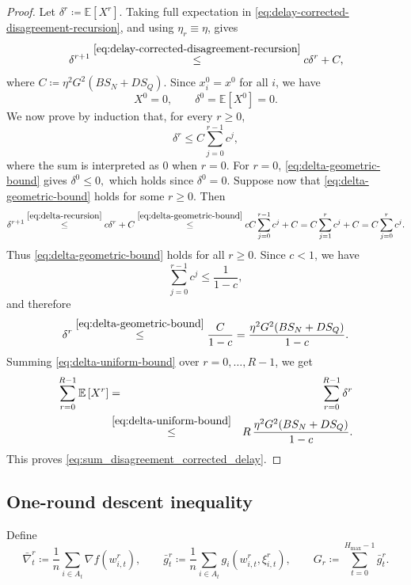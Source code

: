 \documentclass{article}
\newcommand{\eqdef}{\coloneqq}
\newcommand{\Exp}[1]{{\mathbb{E}} \left[ #1 \right]}
\theoremstyle{plain}
\theoremstyle{definition}
\begin{document}
\begin{proof}
Let
\(
\delta^r \eqdef \Exp{X^r}\).
Taking full expectation in \eqref{eq:delay-corrected-disagreement-recursion}, and using
\(\eta_r\equiv \eta\), gives
\begin{eqnarray}
\delta^{r+1}
\overset{\eqref{eq:delay-corrected-disagreement-recursion}}{\leq}
c\delta^r + C,
\label{eq:delta-recursion}
\end{eqnarray}
where \(C \eqdef \eta^2G^2(BS_N+DS_Q)\).
Since \(x_i^0=x^0\) for all \(i\), we have
\[
X^0=0,
\qquad
\delta^0=\Exp{X^0}=0.
\]
We now prove by induction that, for every \(r\geq 0\),
\begin{equation}
\delta^r
\leq
C\sum_{j=0}^{r-1}c^j,
\label{eq:delta-geometric-bound}
\end{equation}
where the sum is interpreted as \(0\) when \(r=0\).
For \(r=0\), \eqref{eq:delta-geometric-bound} gives
\(
\delta^0\leq 0,
\)
which holds since \(\delta^0=0\). Suppose now that \eqref{eq:delta-geometric-bound} holds for some \(r\geq 0\). Then
\begin{eqnarray*}
\delta^{r+1}
\overset{\eqref{eq:delta-recursion}}{\leq}
c\delta^r+C
\overset{\eqref{eq:delta-geometric-bound}}{\leq}
cC\sum_{j=0}^{r-1}c^j+C
=
C\sum_{j=1}^{r}c^j+C
=
C\sum_{j=0}^{r}c^j.
\end{eqnarray*}
Thus \eqref{eq:delta-geometric-bound} holds for all \(r\geq 0\). Since \(c<1\), we have
\[
\sum_{j=0}^{r-1}c^j
\leq
\frac{1}{1-c},
\]
and therefore
\begin{equation}
\delta^r
\overset{\eqref{eq:delta-geometric-bound}}{\leq}
\frac{C}{1-c}
=
\frac{\eta^2G^2(BS_N+DS_Q)}{1-c}.
\label{eq:delta-uniform-bound}
\end{equation}
Summing \eqref{eq:delta-uniform-bound} over \(r=0,\dots,R-1\), we get
\begin{eqnarray*}
\sum_{r=0}^{R-1}\Exp{X^r}
&=&
\sum_{r=0}^{R-1}\delta^r
\\
&\overset{\eqref{eq:delta-uniform-bound}}{\leq}&
R\,\frac{\eta^2G^2(BS_N+DS_Q)}{1-c}.
\end{eqnarray*}
This proves \eqref{eq:sum_disagreement_corrected_delay}.
\end{proof}


\subsection{One-round descent inequality}

Define
\begin{equation}\label{eq:three_defs_final_lemma}
\bar\nabla_t^r \eqdef \frac{1}{n}\sum_{i\in A_t}\nabla f(w_{i,t}^r),
\qquad
\bar g_t^r \eqdef \frac{1}{n}\sum_{i\in A_t} g_i(w_{i,t}^r,\xi_{i,t}^r),
\qquad
G_r \eqdef \sum_{t=0}^{H_{\max}-1}\bar g_t^r.
\end{equation}
\end{document}
